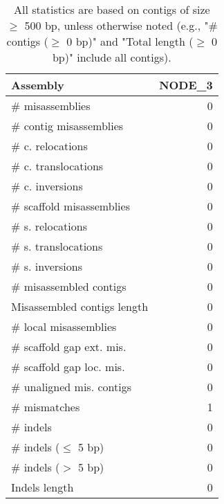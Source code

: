 \documentclass[12pt,a4paper]{article}
\begin{document}
\begin{table}[ht]
\begin{center}
\caption{All statistics are based on contigs of size $\geq$ 500 bp, unless otherwise noted (e.g., "\# contigs ($\geq$ 0 bp)" and "Total length ($\geq$ 0 bp)" include all contigs).}
\begin{tabular}{|l*{1}{|r}|}
\hline
Assembly & NODE\_3 \\ \hline
\# misassemblies & 0 \\ \hline
\hspace{2mm}\# contig misassemblies & 0 \\ \hline
\hspace{5mm}\# c. relocations & 0 \\ \hline
\hspace{5mm}\# c. translocations & 0 \\ \hline
\hspace{5mm}\# c. inversions & 0 \\ \hline
\hspace{2mm}\# scaffold misassemblies & 0 \\ \hline
\hspace{5mm}\# s. relocations & 0 \\ \hline
\hspace{5mm}\# s. translocations & 0 \\ \hline
\hspace{5mm}\# s. inversions & 0 \\ \hline
\# misassembled contigs & 0 \\ \hline
Misassembled contigs length & 0 \\ \hline
\# local misassemblies & 0 \\ \hline
\# scaffold gap ext. mis. & 0 \\ \hline
\# scaffold gap loc. mis. & 0 \\ \hline
\# unaligned mis. contigs & 0 \\ \hline
\# mismatches & 1 \\ \hline
\# indels & 0 \\ \hline
\hspace{5mm}\# indels ($\leq$ 5 bp) & 0 \\ \hline
\hspace{5mm}\# indels ($>$ 5 bp) & 0 \\ \hline
Indels length & 0 \\ \hline
\end{tabular}
\end{center}
\end{table}
\end{document}
